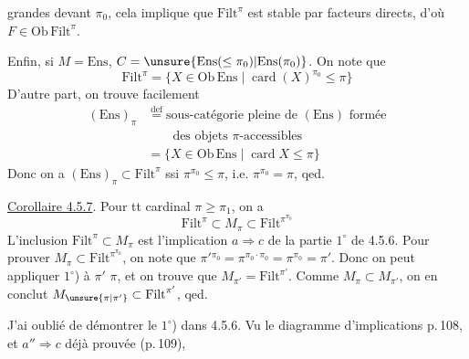 grandes devant $\pi_0$, cela implique que $\mathrm{Filt}^{\pi}$ est stable par facteurs directs, d'où $F\in\mathrm{Ob}\,\mathrm{Filt}^{\pi}$.

Enfin, si $M=\mathrm{Ens}$, $C=\unsure{\mathrm{Ens}(\leq\pi_0)|\mathrm{Ens}(\pi_0)}$. On note que
\[
\mathrm{Filt}^{\pi}=\{X\in\mathrm{Ob}\,\mathrm{Ens}\mid\operatorname{card}(X)^{\pi_0}\leq\pi\}
\]
D'autre part, on trouve facilement
\[
\begin{aligned}
(\mathrm{Ens})_\pi&\overset{\mathrm{def}}=\text{sous-catégorie pleine de }(\mathrm{Ens})\text{ formée}\\
&\qquad\text{des objets }\pi\text{-accessibles}\\
&=\{X\in\mathrm{Ob}\,\mathrm{Ens}\mid\operatorname{card}X\leq\pi\}
\end{aligned}
\]
Donc on a $(\mathrm{Ens})_\pi\subset\mathrm{Filt}^{\pi}$ ssi $\pi^{\pi_0}\leq\pi$, i.e. $\pi^{\pi_0}=\pi$, qed.

\uline{Corollaire 4.5.7}. Pour tt cardinal $\pi\geq\pi_1$, on a
\[
\mathrm{Filt}^{\pi}\subset M_\pi\subset\mathrm{Filt}^{\pi^{\pi_0}}
\tag*{(4.5.7.1)}
\]
L'inclusion $\mathrm{Filt}^{\pi}\subset M_\pi$ est l'implication $a\Rightarrow c$ de la partie $1^\circ$ de 4.5.6. Pour prouver $M_\pi\subset\mathrm{Filt}^{\pi^{\pi_0}}$,     on note que $\pi'{}^{\pi_0}=\pi^{\pi_0\cdot\pi_0}=\pi^{\pi_0}=\pi'$. Donc on peut appliquer $1^\circ$) à $\pi'$  $\pi$, et on trouve que $M_{\pi'}=\mathrm{Filt}^{\pi'}$. Comme $M_\pi\subset M_{\pi'}$, on en conclut $M_{\unsure{\pi|\pi'}}\subset\mathrm{Filt}^{\pi'}$, qed.

J'ai oublié de démontrer le $1^\circ$) dans 4.5.6. Vu le diagramme d'implications  p.\,108, et  $a''\Rightarrow c$ déjà prouvée (p.\,109),
